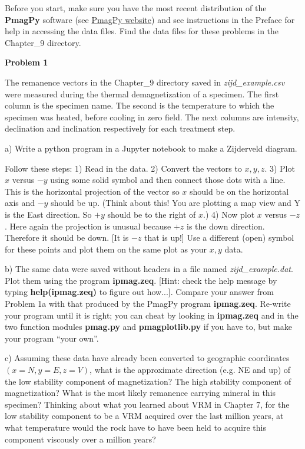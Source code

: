 {\parindent 0pt \parskip 12pt 
\vskip -12pt
Before you start, make sure you have the most recent distribution of the {\bf PmagPy} software (see \href{http://earthref.org/PmagPy/cookbook/}{PmagPy website}) and see instructions in the Preface for help in accessing the data files.  Find the data files for these problems in the Chapter\_9 directory.    

{\bf Problem 1 }

The remanence vectors in the Chapter\_9 directory saved in {\it zijd\_example.csv} were measured during the 
thermal demagnetization of a specimen.  The first column is the specimen name. The second is the temperature to which the specimen was heated, before cooling in zero field.  The next columns are intensity, declination and inclination respectively for each   treatment step.  

a) Write a python program in a Jupyter notebook to make a Zijderveld diagram.  
 
Follow these steps:  1) Read in the data.  2) Convert the vectors to $x, y, z$.  3) Plot $x$ versus $-y$ using some solid symbol and then connect those dots with a line.  This is the horizontal projection  of the vector so $x$ should be on the horizontal axis and $-y$ should be up. (Think about this!   You are plotting a map view and Y is the East direction.  So $+y$ should be to the right of $x$.)   4) Now plot $ x $ versus $-z$.  Here again the projection is unusual because $+z$ is the down direction. Therefore it should be down.  [It is  $-z$ that is up!]    Use a different (open) symbol for these points and plot them on the same plot as your $x,y$ data.   

b) The same data were saved without headers in a file named  {\it zijd\_example.dat}.  Plot them using the program {\bf ipmag.zeq}. [Hint:  check the help message by typing {\bf help(ipmag.zeq)}  to figure out how...].  Compare your answer from Problem 1a  with that produced by the PmagPy program {\bf ipmag.zeq}.  Re-write your program until it is right; you can cheat by looking in {\bf ipmag.zeq} and in the two function modules {\bf pmag.py} and {\bf pmagplotlib.py}  if you have to, but make your program ``your own''.   


c)     Assuming these data have already been converted to geographic coordinates $(x=N, y=E, z=V)$, what is the approximate direction (e.g. NE and up) of the low stability component
of magnetization? The high stability component of magnetization? What is
the most likely remanence carrying mineral in this specimen?   Thinking about what you learned about VRM in Chapter 7, for the low stability component to be a VRM acquired over the last million years,  at what temperature would the rock have to have been held to acquire this component viscously over a million years?  


}

